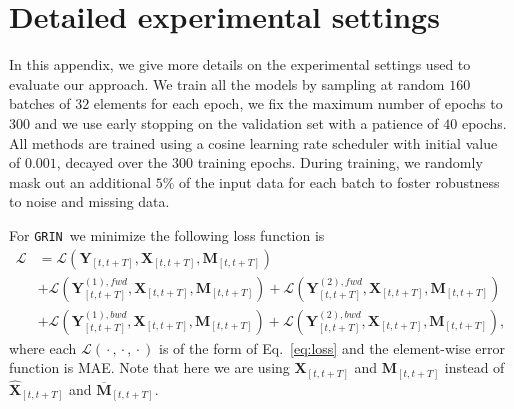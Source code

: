 \documentclass{article} \usepackage{iclr2022_conference,times}
\def\mM{{\bm{M}}}
\def\mX{{\bm{X}}}
\def\mY{{\bm{Y}}}
\newcommand{\Ls}{\mathcal{L}}
\newcommand{\GRIL}{\texttt{GRIN}}
\begin{document}
\section{Detailed experimental settings}
\label{a:appendix_exp}

In this appendix, we give more details on the experimental settings used to evaluate our approach. 
We train all the models by sampling at random $160$ batches of $32$ elements for each epoch, we fix the maximum number of epochs to $300$ and we use early stopping on the validation set with a patience of $40$ epochs. All methods are trained using a  cosine learning rate scheduler with initial value of $0.001$, decayed over the $300$ training epochs. During training, we randomly mask out an additional $5\%$ of the input data for each batch to foster robustness to noise and missing data.

For \GRIL\ we minimize the following loss function is
\begin{align*}
    \Ls &= \Ls\left(\mY_{[t, t+T]}, \mX_{[t, t+T]}, \mM_{[t, t+T]}\right) \\&+ \Ls\left(\mY_{[t, t+T]}^{(1), fwd}, \mX_{[t, t+T]}, \mM_{[t, t+T]}\right) + \Ls\left(\mY_{[t, t+T]}^{(2), fwd}, \mX_{[t, t+T]}, \mM_{[t, t+T]}\right) \\&+ \Ls\left(\mY_{[t, t+T]}^{(1), bwd}, \mX_{[t, t+T]}, \mM_{[t, t+T]}\right)+ \Ls\left(\mY_{[t, t+T]}^{(2), bwd}, \mX_{[t, t+T]}, \mM_{[t, t+T]}\right),
\end{align*}
where each $\Ls\left({}\cdot{},{}\cdot{},{}\cdot{}\right)$ is of the form of Eq.~\ref{eq:loss} and the element-wise error function is MAE. Note that here we are using $\mX_{[t, t+T]}$ and $\mM_{[t, t+T]}$ instead of $\widehat \mX_{[t, t+T]}$ and $\overline\mM_{[t, t+T]}$.
\end{document}
